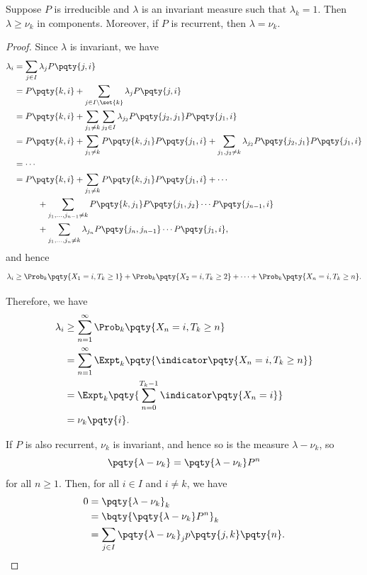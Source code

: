 \begin{theorem}
    \label{thm:uniqueness-of-invariant-measure}%
    Suppose \(P\) is irreducible and \(\lambda\) is an invariant measure such that \(\lambda_k = 1\). Then \(\lambda \geq \nu_k\) in components. Moreover, if \(P\) is recurrent, then \(\lambda = \nu_k\).
\end{theorem}

\begin{proof}
    Since \(\lambda\) is invariant, we have
    \begin{align*}
        \lambda_i &= \sum_{j \in I} \lambda_j P\pqty{j, i} \\
        &= P\pqty{k, i} + \sum_{j \in I \setminus \set{k}} \lambda_j P\pqty{j, i} \\
        &= P\pqty{k, i} + \sum_{j_1 \neq k} \sum_{j_2 \in I} \lambda_{j_2} P\pqty{j_2, j_1} P\pqty{j_1, i} \\
        &= P\pqty{k, i} + \sum_{j_1 \neq k} P\pqty{k, j_1} P\pqty{j_1, i} + \sum_{j_1, j_2 \neq k} \lambda_{j_2} P\pqty{j_2, j_1} P\pqty{j_1, i} \\
        &= \cdots \\
        &= P\pqty{k, i} + \sum_{j_1 \neq k} P\pqty{k, j_1} P\pqty{j_1, i} + \cdots \\
        &\phantom{=} \qquad + \sum_{j_1, \ldots, j_{n - 1} \neq k} P\pqty{k, j_1} P\pqty{j_1, j_2} \cdots P\pqty{j_{n - 1}, i} \\
        &\phantom{=} \qquad + \sum_{j_1, \ldots, j_n \neq k} \lambda_{j_n} P\pqty{j_n, j_{n - 1}} \cdots P\pqty{j_1, i},
    \end{align*}
    and hence
    \[
        \lambda_i \geq \Prob_k \pqty{X_1 = i, T_k \geq 1} + \Prob_k \pqty{X_2 = i, T_k \geq 2} + \cdots + \Prob_k \pqty{X_n = i, T_k \geq n}.
    \]

    Therefore, we have
    \begin{align*}
        \lambda_i &\geq \sum_{n = 1}^{\infty} \Prob_k \pqty{X_n = i, T_k \geq n} \\
        &= \sum_{n = 1}^{\infty} \Expt_k \pqty{\indicator\pqty{X_n = i, T_k \geq n}} \\
        &= \Expt_k \pqty{\sum_{n = 0}^{T_k - 1} \indicator\pqty{X_n = i}} \\
        &= \nu_k \pqty{i}.
    \end{align*}

    If \(P\) is also recurrent, \(\nu_k\) is invariant, and hence so is the measure \(\lambda - \nu_k\), so
    \[
        \pqty{\lambda - \nu_k} = \pqty{\lambda - \nu_k} P^n
    \]
    for all \(n \geq 1\). Then, for all \(i \in I\) and \(i \neq k\), we have
    \begin{align*}
        0 &= \pqty{\lambda - \nu_k}_k \\
        &= \bqty{\pqty{\lambda - \nu_k} P^n}_k \\
        &= \sum_{j \in I} \pqty{\lambda - \nu_k}_j p\pqty{j, k} \pqty{n}.
    \end{align*}


\end{proof}
